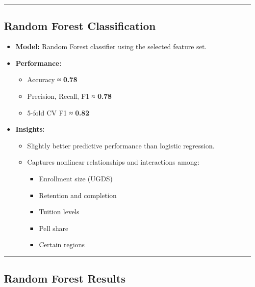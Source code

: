 \documentclass[
  letterpaper,
  DIV=11,
  numbers=noendperiod]{scrartcl}
\providecommand{\tightlist}{%
  \setlength{\itemsep}{0pt}\setlength{\parskip}{0pt}}
\begin{document}
\begin{center}\rule{0.5\linewidth}{0.5pt}\end{center}

\subsection{Random Forest
Classification}\label{random-forest-classification}

\begin{itemize}
\tightlist
\item
  \textbf{Model:} Random Forest classifier using the selected feature
  set.
\item
  \textbf{Performance:}

  \begin{itemize}
  \tightlist
  \item
    Accuracy ≈ \textbf{0.78}
  \item
    Precision, Recall, F1 ≈ \textbf{0.78}
  \item
    5-fold CV F1 ≈ \textbf{0.82}
  \end{itemize}
\item
  \textbf{Insights:}

  \begin{itemize}
  \tightlist
  \item
    Slightly better predictive performance than logistic regression.
  \item
    Captures nonlinear relationships and interactions among:

    \begin{itemize}
    \tightlist
    \item
      Enrollment size (UGDS)
    \item
      Retention and completion
    \item
      Tuition levels
    \item
      Pell share
    \item
      Certain regions
    \end{itemize}
  \end{itemize}
\end{itemize}

\begin{center}\rule{0.5\linewidth}{0.5pt}\end{center}

\subsection{Random Forest Results}\label{random-forest-results}
\end{document}
